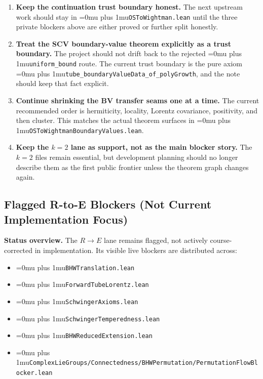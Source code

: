 \documentclass[11pt,a4paper]{article}
\newcommand{\leanfile}[1]{\begingroup\Urlmuskip=0mu plus 1mu\relax\nolinkurl{#1}\endgroup}
\newcommand{\leanname}[1]{\begingroup\Urlmuskip=0mu plus 1mu\relax\nolinkurl{#1}\endgroup}
\begin{document}
\begin{enumerate}
\item \textbf{Keep the continuation trust boundary honest.}
  The next upstream work should stay in \leanfile{OSToWightman.lean} until the
  three private blockers above are either proved or further split honestly.

\item \textbf{Treat the SCV boundary-value theorem explicitly as a trust boundary.}
  The project should not drift back to the rejected
  \leanname{uniform\_bound} route. The current trust boundary is the pure axiom
  \leanname{tube\_boundaryValueData\_of\_polyGrowth}, and the note should keep
  that fact explicit.

\item \textbf{Continue shrinking the BV transfer seams one at a time.}
  The current recommended order is hermiticity, locality, Lorentz covariance,
  positivity, and then cluster. This matches the actual theorem surfaces in
  \leanfile{OSToWightmanBoundaryValues.lean}.

\item \textbf{Keep the $k=2$ lane as support, not as the main blocker story.}
  The $k=2$ files remain essential, but development planning should no longer
  describe them as the first public frontier unless the theorem graph changes
  again.
\end{enumerate}

\subsection{Flagged R-to-E Blockers (Not Current Implementation Focus)}

\textbf{Status overview.}
The $R \to E$ lane remains flagged, not actively course-corrected in
implementation. Its visible live blockers are distributed across:
\begin{itemize}
\item \leanfile{BHWTranslation.lean}
\item \leanfile{ForwardTubeLorentz.lean}
\item \leanfile{SchwingerAxioms.lean}
\item \leanfile{SchwingerTemperedness.lean}
\item \leanfile{BHWReducedExtension.lean}
\item \leanfile{ComplexLieGroups/Connectedness/BHWPermutation/PermutationFlowBlocker.lean}
\end{itemize}
\end{document}
